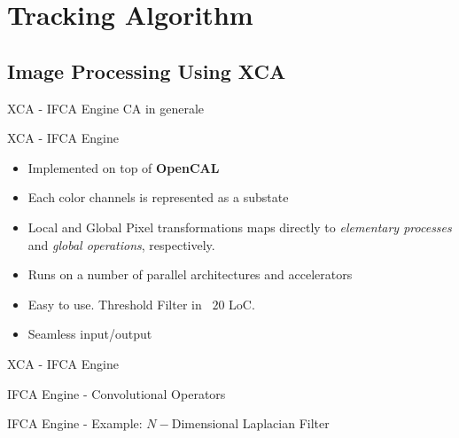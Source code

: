 \documentclass{beamer}
\begin{document}
	

\section{Tracking Algorithm}

	\subsection{Image Processing Using XCA}
		\begin{frame}{XCA - IFCA Engine }
			CA in generale			
		\end{frame}
		\begin{frame}{XCA - IFCA Engine}
			\begin{itemize}
			\item Implemented on top of \textbf{OpenCAL}
			\item Each color channels is represented as a substate
			\item Local and Global Pixel transformations maps directly to \textit{elementary processes} and \textit{global operations}, respectively.
			\item Runs on a number of parallel architectures and accelerators
			\item Easy to use. Threshold Filter in ~$20$ LoC.
			\item Seamless input/output
			\end{itemize}
		\end{frame}
		\begin{frame}{XCA - IFCA Engine}
			
		\end{frame}		
		
		\begin{frame}{IFCA Engine - Convolutional Operators}
			
		\end{frame}
		\begin{frame}{IFCA Engine - Example: $N-$Dimensional Laplacian Filter}
			
		\end{frame}	
		
\end{document}
